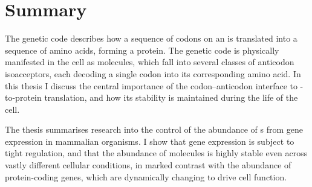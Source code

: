 \chapter*{Summary}

The genetic code describes how a sequence of codons on an  is
translated into a sequence of amino acids, forming a protein. The genetic code
is physically manifested in the cell as  molecules, which fall into
several classes of anticodon isoacceptors, each decoding a single codon into its
corresponding amino acid. In this thesis I discuss the central importance of the
codon--anticodon interface to -to-protein translation, and how its
stability is maintained during the life of the cell.

The thesis summarises research into the control of the abundance of
s from  gene expression in mammalian organisms. I show
that  gene expression is subject to tight regulation, and that the
abundance of  molecules is highly stable even across vastly different
cellular conditions, in marked contrast with the abundance of protein-coding
genes, which are dynamically changing to drive cell function.
